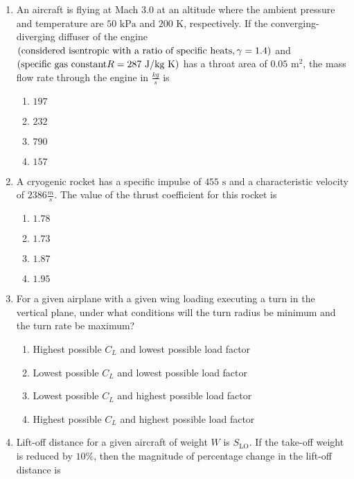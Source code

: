 \documentclass[journal,12pt,twocolumn]{IEEEtran}
\theoremstyle{remark}
\begin{document}
\begin{enumerate}[start=40]
    \item An aircraft is flying at Mach $3.0$ at an altitude where the ambient pressure and temperature are $50 \text{ kPa}$ and $200 \text{ K}$, respectively. If the converging-diverging diffuser of the engine $\left(\text{considered isentropic with a ratio of specific heats}, \gamma = 1.4\right)$ and $\left(\text{specific gas constant} R = 287 \text{ J/kg K}\right)$ has a throat area of $0.05 \text{ m}^2$, the mass flow rate through the engine in $\frac{kg}{s}$ is
    \begin{enumerate}
        \item $197$
        \item $232$
        \item $790$
        \item $157$
    \end{enumerate}

    \item A cryogenic rocket has a specific impulse of $455 \text{ s}$ and a characteristic velocity of $2386 \frac{ m}{s}$. The value of the thrust coefficient for this rocket is
    \begin{enumerate}
        \item $1.78$
        \item $1.73$
        \item $1.87$
        \item $1.95$
    \end{enumerate}

    \item For a given airplane with a given wing loading executing a turn in the vertical plane, under what conditions will the turn radius be minimum and the turn rate be maximum?
    \begin{enumerate}
        \item Highest possible $C_L$ and lowest possible load factor
        \item Lowest possible $C_L$ and lowest possible load factor
        \item Lowest possible $C_L$ and highest possible load factor
        \item Highest possible $C_L$ and highest possible load factor
    \end{enumerate}

    \item Lift-off distance for a given aircraft of weight $W$ is $S_{\text{LO}}$. If the take-off weight is reduced by $10\%$, then the magnitude of percentage change in the lift-off distance  is


 






 
\end{enumerate}
\end{document}
